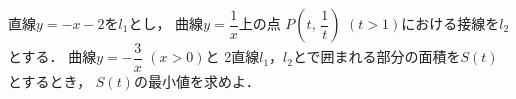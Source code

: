 \documentclass[../../main.tex]{subfiles}
\begin{document}
直線$y=-x-2$を$l_1$とし，
曲線$\displaystyle y=\dfrac{1}{x}$上の点
$\displaystyle P \left( t, \, \dfrac{1}{t} \right)$ $(t>1)$における接線を$l_2$とする．
曲線$\displaystyle y=-\dfrac{3}{x}$ $(x>0)$と
2直線$l_1$，$l_2$とで囲まれる部分の面積を$S(t)$とするとき，
$S(t)$の最小値を求めよ．
\end{document}
